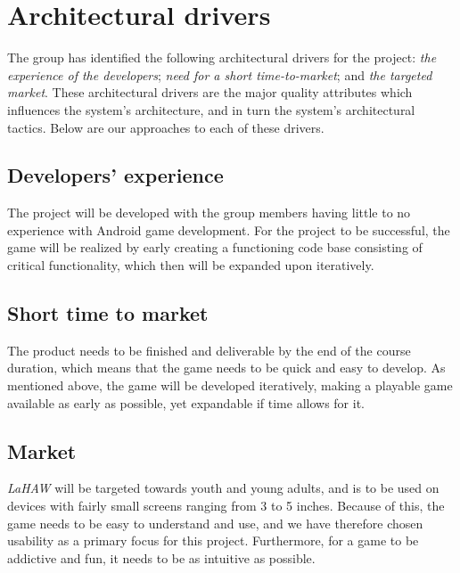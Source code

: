\chapter{Architectural drivers}
The group has identified the following architectural drivers for the project: \emph{the experience of the developers}; \emph{need for a short time-to-market}; and \emph{the targeted market}. These architectural drivers are the major quality attributes which influences the system's architecture, and in turn the system's architectural tactics\cite{pensum}. Below are our approaches to each of these drivers.


	\section{Developers' experience}
	The project will be developed with the group members having little to no experience with Android game development. For the project to be successful, the game will be realized by early creating a functioning code base consisting of critical functionality, which then will be expanded upon iteratively.

	\section{Short time to market}
	The product needs to be finished and deliverable by the end of the course duration, which means that the game needs to be quick and easy to develop. As mentioned above, the game will be developed iteratively, making a playable game available as early as possible, yet expandable if time allows for it.

	\section{Market}
	\emph{LaHAW} will be targeted towards youth and young adults, and is to be used on devices with fairly small screens ranging from 3 to 5 inches. Because of this, the game needs to be easy to understand and use, and we have therefore chosen usability as a primary focus for this project. Furthermore, for a game to be addictive and fun, it needs to be as intuitive as possible.

